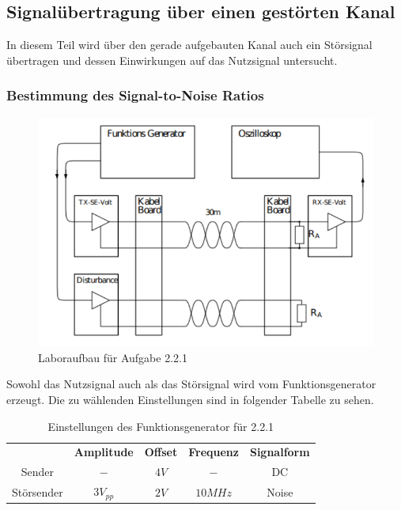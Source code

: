 \documentclass[a4paper,12pt]{article}
\begin{document}
	\subsection{Signalübertragung über einen gestörten Kanal}
	In diesem Teil wird über den gerade aufgebauten Kanal auch ein Störsignal übertragen und dessen Einwirkungen auf das Nutzsignal untersucht.
	\subsubsection{Bestimmung des Signal-to-Noise Ratios}
	\begin{figure}[h]
		\centering
		\includegraphics[width=12cm]{img/Laboraufbau2_2_1}
		\caption{Laboraufbau für Aufgabe 2.2.1}
	\end{figure}
	\noindent
	Sowohl das Nutzsignal auch als das Störsignal wird vom Funktionsgenerator erzeugt. Die zu wählenden Einstellungen sind in folgender Tabelle zu sehen.
	\newpage
	\begin{table}[h]
		\centering
		\begin{tabular}{|c|c|c|c|c|}
			\hline
			\multirow{2}{*}{} & \multirow{2}{*}{\textbf{Amplitude}} & \multirow{2}{*}{\textbf{Offset}} & \multirow{2}{*}{\textbf{Frequenz}} & \multirow{2}{*}{\textbf{Signalform}} \\
			&  &  &  &  \\ \hline
			\multirow{2}{*}{Sender} & \multirow{2}{*}{$-$} & \multirow{2}{*}{$4V$} & \multirow{2}{*}{$-$} & \multirow{2}{*}{DC} \\
			&  &  &  &  \\ \hline
			\multirow{2}{*}{Störsender} & \multirow{2}{*}{$3V_{pp}$} & \multirow{2}{*}{$2V$} & \multirow{2}{*}{$10MHz$} & \multirow{2}{*}{Noise} \\
			&  &  &  &  \\ \hline
		\end{tabular}
	\caption{Einstellungen des Funktionsgenerator für 2.2.1}
	\end{table}
\end{document}
